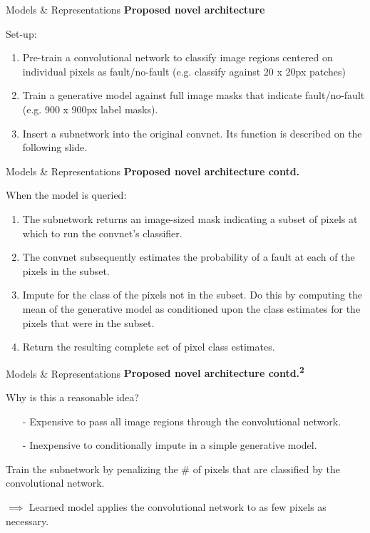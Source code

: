 \documentclass[10pt]{beamer}
\begin{document}
\begin{frame}{Models \& Representations}
	\textbf{Proposed novel architecture}
	
	Set-up:
	\begin{enumerate}
		\item Pre-train a convolutional network to classify image regions centered on individual pixels as fault/no-fault (e.g. classify against 20 x 20px patches)
		\item Train a generative model against full image masks that indicate fault/no-fault (e.g. 900 x 900px label masks).
		\item Insert a subnetwork into the original convnet. Its function is described on the following slide.
	\end{enumerate}
\end{frame}

\begin{frame}{Models \& Representations}
	\textbf{Proposed novel architecture contd.}
	
	When the model is queried:
	\begin{enumerate}
		\item The subnetwork returns an image-sized mask indicating a subset of pixels at which to run the convnet's classifier.
		\item The convnet subsequently estimates the probability of a fault at each of the pixels in the subset.
		\item Impute for the class of the pixels not in the subset. Do this by computing the mean of the generative model as conditioned upon the class estimates for the pixels that were in the subset.
		\item Return the resulting complete set of pixel class estimates.
	\end{enumerate}
\end{frame}

\begin{frame}{Models \& Representations}
	\textbf{Proposed novel architecture contd.\textsuperscript{2}}
	
	Why is this a reasonable idea?
	\begin{itemize}
	\item[-] Expensive to pass all image regions through the convolutional network.
	\item[-] Inexpensive to conditionally impute in a simple generative model.
	\end{itemize}
	
	\vfill
	Train the subnetwork by penalizing the \# of pixels that are classified by the convolutional network.
	
	$\implies$ Learned model applies the convolutional network to as few pixels as necessary.
\end{frame}
\end{document}
